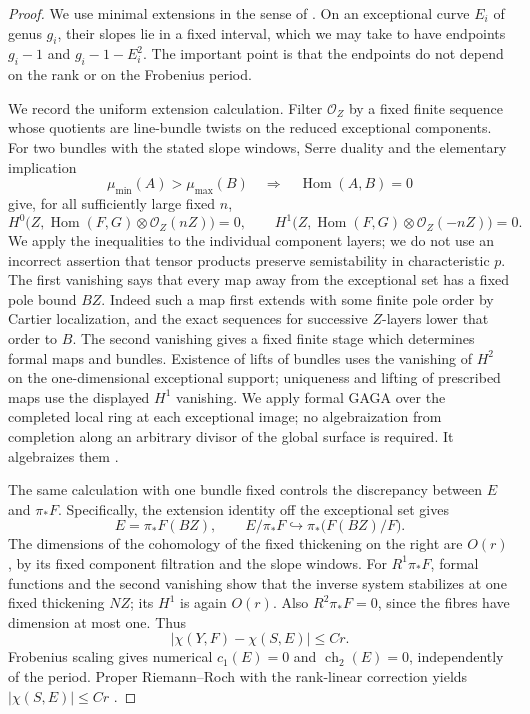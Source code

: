 \begin{proof}
We use minimal extensions in the sense of
\citet[Definition 1.2 and Lemma 1.3]{C_Langer2026}. On an exceptional
curve $E_i$ of genus $g_i$, their slopes lie in a fixed interval, which
we may take to have endpoints $g_i-1$ and $g_i-1-E_i^2$. The important
point is that the endpoints do not depend on the rank or on the
Frobenius period.

We record the uniform extension calculation. Filter $\mathcal O_Z$ by
a fixed finite sequence whose quotients are line-bundle twists on the
reduced exceptional components. For two bundles with the stated slope
windows, Serre duality and the elementary implication
\[
 \mu_{\min}(A)>\mu_{\max}(B)\quad\Longrightarrow\quad
 \operatorname{Hom}(A,B)=0
\]
give, for all sufficiently large fixed $n$,
\[
 H^0\bigl(Z,\operatorname{Hom}(F,G)\otimes\mathcal O_Z(nZ)\bigr)=0,
 \qquad
 H^1\bigl(Z,\operatorname{Hom}(F,G)\otimes\mathcal O_Z(-nZ)\bigr)=0.
\]
We apply the inequalities to the individual component layers; we do
not use an incorrect assertion that tensor products preserve
semistability in characteristic $p$. The first vanishing says that
every map away from the exceptional set has a fixed pole bound $BZ$.
Indeed such a map first extends with some finite pole order by Cartier
localization, and the exact sequences for successive $Z$-layers lower
that order to $B$. The second vanishing gives a fixed finite stage
which determines formal maps and bundles. Existence of lifts of bundles
uses the vanishing of $H^2$ on the one-dimensional exceptional support;
uniqueness and lifting of prescribed maps use the displayed $H^1$
vanishing. We apply formal GAGA over the completed local ring at
each exceptional image; no algebraization from completion along
an arbitrary divisor of the global surface is required. It algebraizes them
\citep[Tags 0885, 08MD, 08MF]{C_StacksBoundedReflexive}.

The same calculation with one bundle fixed controls the discrepancy
between $E$ and $\pi_*F$. Specifically, the extension identity off the
exceptional set gives
\[
 E=\pi_*F(BZ),\qquad
 E/\pi_*F\hookrightarrow\pi_*\bigl(F(BZ)/F\bigr).
\]
The dimensions of the cohomology of the fixed thickening on the right
are $O(r)$, by its fixed component filtration and the slope windows.
For $R^1\pi_*F$, formal functions and the second vanishing show that
the inverse system stabilizes at one fixed thickening $NZ$; its
$H^1$ is again $O(r)$. Also $R^2\pi_*F=0$, since the fibres have
dimension at most one. Thus
\[
 |\chi(Y,F)-\chi(S,E)|\le Cr.
\]
Frobenius scaling gives numerical $c_1(E)=0$ and
$\operatorname{ch}_2(E)=0$, independently of the period. Proper
Riemann--Roch with the rank-linear correction yields
$|\chi(S,E)|\le Cr$
\citep[Theorem 4.5(2)]{C_Langer2025}
\citep[Theorem 0.1]{C_Langer2026}.


\end{proof}
